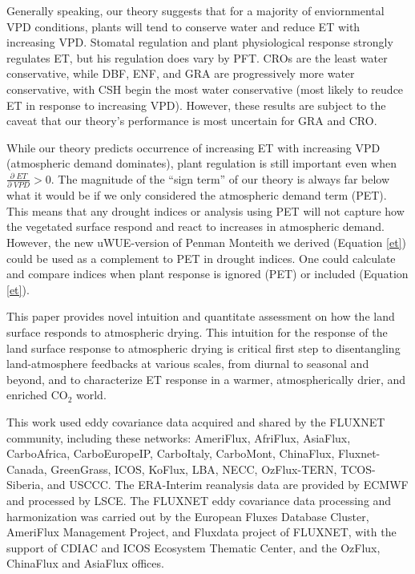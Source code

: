 \documentclass[draft,linenumbers]{agujournal}
\begin{document}
Generally speaking, our theory suggests that for a majority of enviornmental VPD conditions, plants will tend to conserve water and reduce ET with increasing VPD. Stomatal regulation and plant physiological response strongly regulates ET, but his regulation does vary by PFT. CROs are the least water conservative, while DBF, ENF, and GRA are progressively more water conservative, with CSH begin the most water conservative (most likely to reudce ET in response to increasing VPD). However, these results are subject to the caveat that our theory's performance is most uncertain for GRA and CRO.

While our theory predicts occurrence of increasing ET with increasing VPD (atmospheric demand dominates), plant regulation is still important even when $\frac{\partial \; ET}{\partial \; VPD} > 0$. The magnitude of the ``sign term'' of our theory is always far below what it would be if we only considered the atmospheric demand term (PET). This means that any drought indices or analysis using PET will not capture how the vegetated surface respond and react to increases in atmospheric demand. However, the new uWUE-version of Penman Monteith we derived (Equation \ref{et}) could be used as a complement to PET in drought indices. One could calculate and compare indices  when plant response is ignored (PET) or included (Equation \ref{et}). 

This paper provides novel intuition and quantitate assessment on how the land surface responds to atmospheric drying. This intuition for the response of the land surface response to atmospheric drying is critical first step to disentangling land-atmosphere feedbacks at various scales, from diurnal to seasonal and beyond, and to characterize ET response in a warmer, atmospherically drier, and enriched CO$_2$ world. 


\acknowledgments
This work used eddy covariance data acquired and shared by the FLUXNET community, including these networks: AmeriFlux, AfriFlux, AsiaFlux, CarboAfrica, CarboEuropeIP, CarboItaly, CarboMont, ChinaFlux, Fluxnet-Canada, GreenGrass, ICOS, KoFlux, LBA, NECC, OzFlux-TERN, TCOS-Siberia, and USCCC. The ERA-Interim reanalysis data are provided by ECMWF and processed by LSCE. The FLUXNET eddy covariance data processing and harmonization was carried out by the European Fluxes Database Cluster, AmeriFlux Management Project, and Fluxdata project of FLUXNET, with the support of CDIAC and ICOS Ecosystem Thematic Center, and the OzFlux, ChinaFlux and AsiaFlux offices.


% 

\listofchanges
\end{document}
